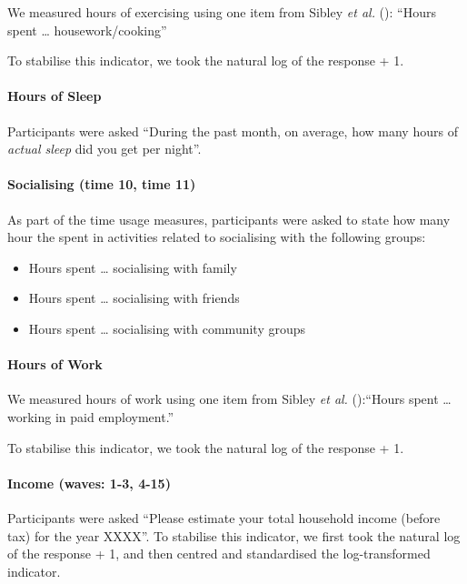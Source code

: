 \documentclass[
  singlecolumn]{article}
\let\oldparagraph\paragraph
\renewcommand{\paragraph}[1]{\oldparagraph{#1}\mbox{}}
\providecommand{\tightlist}{%
  \setlength{\itemsep}{0pt}\setlength{\parskip}{0pt}}\usepackage{longtable,booktabs,array}
\begin{document}
We measured hours of exercising using one item from Sibley \emph{et al.}
(): ``Hours spent \ldots{}
housework/cooking''

To stabilise this indicator, we took the natural log of the response +
1.

\paragraph{Hours of Sleep}\label{hours-of-sleep}

Participants were asked ``During the past month, on average, how many
hours of \emph{actual sleep} did you get per night''.

\paragraph{Socialising (time 10, time
11)}\label{socialising-time-10-time-11}

As part of the time usage measures, participants were asked to state how
many hour the spent in activities related to socialising with the
following groups:

\begin{itemize}
\tightlist
\item
  Hours spent \ldots{} socialising with family
\item
  Hours spent \ldots{} socialising with friends
\item
  Hours spent \ldots{} socialising with community groups
\end{itemize}

\paragraph{Hours of Work}\label{hours-of-work}

We measured hours of work using one item from Sibley \emph{et al.}
():``Hours spent \ldots{} working in paid
employment.''

To stabilise this indicator, we took the natural log of the response +
1.

\paragraph{Income (waves: 1-3, 4-15)}\label{income-waves-1-3-4-15}

Participants were asked ``Please estimate your total household income
(before tax) for the year XXXX''. To stabilise this indicator, we first
took the natural log of the response + 1, and then centred and
standardised the log-transformed indicator.
\end{document}
